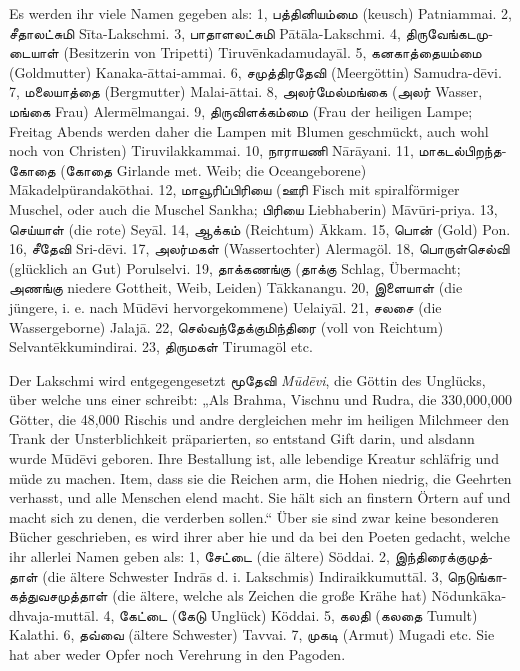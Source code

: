 \documentclass{article}
\newcommand{\TamilText}[1]{\texttamil{#1}}
\newcommand{\tam}[1]{\TamilText{#1}}
\begin{document}
Es werden ihr viele Namen gegeben als: 1, \tam{பத்தினியம்மை} (keusch) Patniammai. 2, \tam{சீதாலட்சுமி} S\={i}ta-Lakschmi. 3, \tam{பாதாளலட்சுமி} P\={a}t\={a}la-Lakschmi. 4, \tam{திருவேங்கடமுடையாள்} (Besitzerin von Tripetti) Tiruv\={e}nkadamuday\={a}l. 5, \tam{கனகாத்தையம்மை} (Goldmutter) Kanaka-\={a}ttai-ammai. 6, \tam{சமுத்திரதேவி} (Meergöttin) Samudra-d\={e}vi. 7, \tam{மலையாத்தை} (Bergmutter) Malai-\={a}ttai. 8, \tam{அலர்மேல்மங்கை} (\tam{அலர்} Wasser, \tam{மங்கை} Frau) Alerm\={e}lmangai. 9, \tam{திருவிளக்கம்மை} (Frau der heiligen Lampe; Freitag Abends werden daher die Lampen mit Blumen geschmückt, auch wohl noch von Christen) Tiruvilakkammai. 10, \tam{நாராயணி} N\={a}r\={a}yani. 11, \tam{மாகடல்பிறந்தகோதை} (\tam{கோதை} Girlande met. Weib; die Oceangeborene) M\={a}kadelpürandak\={o}thai. 12, \tam{மாவூரிப்பிரியை} (\tam{ஊரி} Fisch mit spiralförmiger Muschel, oder auch die Muschel Sankha; \tam{பிரியை} Liebhaberin) M\={a}v\={u}ri-priya. 13, \tam{செய்யாள்} (die rote) Sey\={a}l. 14, \tam{ஆக்கம்} (Reichtum) \={A}kkam. 15, \tam{பொன்} (Gold) Pon. 16, \tam{சீதேவி} Sri-d\={e}vi. 17, \tam{அலர்மகள்} (Wassertochter) Alermagöl. 18, \tam{பொருள்செல்வி} (glücklich an Gut) Porulselvi. 19, \tam{தாக்கணங்கு} (\tam{தாக்கு} Schlag, Übermacht; \tam{அணங்கு} niedere Gottheit, Weib, Leiden) T\={a}kkanangu. 20, \tam{இளையாள்} (die jüngere, i. e. nach M\={u}d\={e}vi hervorgekommene) Uelaiy\={a}l. 21, \tam{சலசை} (die Wassergeborne) Jalaj\={a}. 22, \tam{செல்வந்தேக்குமிந்திரை} (voll von Reichtum) Selvant\={e}kkumindirai. 23, \tam{திருமகள்} Tirumagöl etc.

Der Lakschmi wird entgegengesetzt \tam{மூதேவி} \emph{M\={u}d\={e}vi}, die Göttin des Unglücks, über welche uns einer schreibt: „Als Brahma, Vischnu und Rudra, die 330,000,000 Götter, die 48,000 Rischis und andre dergleichen mehr im heiligen Milchmeer den Trank der Unsterblichkeit präparierten, so entstand Gift darin, und alsdann wurde M\={u}d\={e}vi geboren. Ihre Bestallung ist, alle lebendige Kreatur schläfrig und müde zu machen. Item, dass sie die Reichen arm, die Hohen niedrig, die Geehrten verhasst, und alle Menschen elend macht. Sie hält sich an finstern Örtern auf und macht sich zu denen, die verderben sollen.“ Über sie sind zwar keine besonderen Bücher geschrieben, es wird ihrer aber hie und da bei den Poeten gedacht, welche ihr allerlei Namen geben als: 1, \tam{சேட்டை} (die ältere) Söddai. 2, \tam{இந்திரைக்குமுத்தாள்} (die ältere Schwester Indr\={a}s d. i. Lakschmis) Indiraikkumutt\={a}l. 3, \tam{நெடுங்காகத்துவசமுத்தாள்} (die ältere, welche als Zeichen die große Krähe hat) Nödunk\={a}ka-dhvaja-mutt\={a}l. 4, \tam{கேட்டை} (\tam{கேடு} Unglück) Köddai. 5, \tam{கலதி} (\tam{கலதை} Tumult) Kalathi. 6, \tam{தவ்வை} (ältere Schwester) Tavvai. 7, \tam{முகடி} (Armut) Mugadi etc. Sie hat aber weder Opfer noch Verehrung in den Pagoden.
\end{document}

